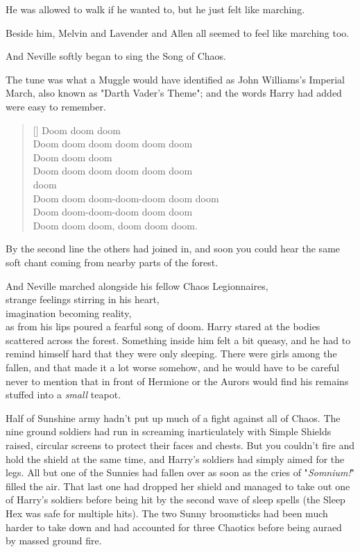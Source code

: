 He was allowed to walk if he wanted to, but he just felt like marching.

Beside him, Melvin and Lavender and Allen all seemed to feel like marching too.

And Neville softly began to sing the Song of Chaos.

The tune was what a Muggle would have identified as John Williams's Imperial
March, also known as "Darth Vader's Theme"; and the words Harry had added were
easy to remember.

\baselineskip\settowidth{\versewidth}{Doom doom doom-doom-doom doom doom}
\begin{verse}[\versewidth]
Doom doom doom\\
Doom doom doom doom doom doom\\
Doom doom doom\\
Doom doom doom doom doom doom\\
 doom \\
Doom doom doom-doom-doom doom doom\\
Doom doom-doom-doom doom doom\\
Doom doom doom, doom doom doom.
\end{verse}\baselineskip

By the second line the others had joined in, and soon you could hear the same
soft chant coming from nearby parts of the forest.

And Neville marched alongside his fellow Chaos Legionnaires,\\
strange feelings stirring in his heart,\\
imagination becoming reality,\\
as from his lips poured a fearful song of doom.
\sbreak
Harry stared at the bodies scattered across the forest. Something inside him
felt a bit queasy, and he had to remind himself hard that they were only
sleeping. There were girls among the fallen, and that made it a lot worse
somehow, and he would have to be careful never to mention that in front of
Hermione or the Aurors would find his remains stuffed into a \emph{small}
teapot.

Half of Sunshine army hadn't put up much of a fight against all of Chaos. The
nine ground soldiers had run in screaming inarticulately with Simple Shields
raised, circular screens to protect their faces and chests. But you couldn't
fire and hold the shield at the same time, and Harry's soldiers had simply
aimed for the legs. All but one of the Sunnies had fallen over as soon as the
cries of "\emph{Somnium!}" filled the air. That last one had dropped her shield
and managed to take out one of Harry's soldiers before being hit by the second
wave of sleep spells (the Sleep Hex was safe for multiple hits). The two Sunny
broomsticks had been much harder to take down and had accounted for three
Chaotics before being auraed by massed ground fire.

